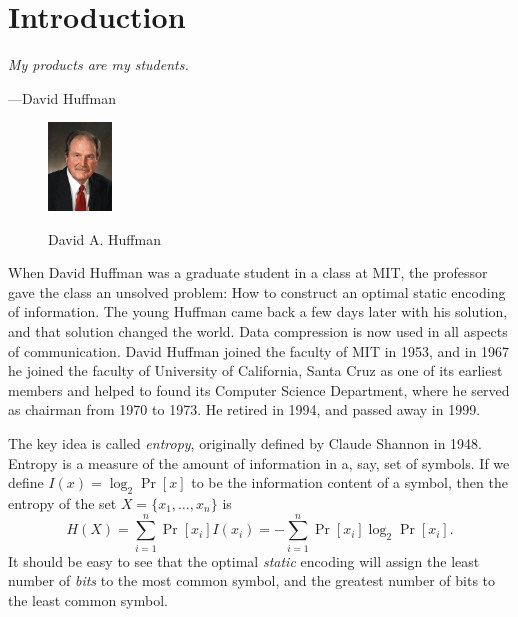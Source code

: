 \section{Introduction}

\textwidth
\epigraph{\emph{My products are my students.}}{---David Huffman}

\begin{figure}
  \begin{center}
\includegraphics[width=0.15\textwidth]{images/huffman.jpg}
\centerline{\small David A. Huffman}
  \end{center}
\end{figure}

When David Huffman was a graduate student in a class at MIT, the
professor gave the class an unsolved problem: How to construct an
optimal static encoding of information. The young Huffman came back
a few days later with his solution, and that solution changed the
world. Data compression is now used in all aspects of communication.
David Huffman joined the faculty of MIT in 1953, and in 1967 he
joined the faculty of University of California, Santa Cruz as one
of its earliest members and helped to found its Computer Science
Department, where he served as chairman from 1970 to 1973. He retired
in 1994, and passed away in 1999.

The key idea is called \emph{entropy}, originally defined by Claude Shannon in
1948. Entropy is a measure of the amount of information in a, say, set of
symbols. If we define $I(x) = \log_2 \Pr[x]$ to be the information content of
a symbol, then the entropy of the set $X=\{x_1, \ldots, x_n \}$ is
$$
H(X) = \sum_{i=1}^n \Pr[x_i] I(x_i) = - \sum_{i=1}^n \Pr[x_i] \log_2 \Pr[x_i].
$$
It should be easy to see that the optimal \emph{static} encoding will assign
the least number of \emph{bits} to the most common symbol, and the greatest
number of bits to the least common symbol.
